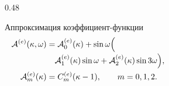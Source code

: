 \begin{frame}[t]
\begin{columns}[T,onlytextwidth]
\begin{column}{0.48\textwidth}
            \vspace{-0.02cm}
            \raggedright
            Аппроксимация коэффициент-функции
            \vspace{-0.18cm}
            \[
            \makebox[\linewidth][l]{$\displaystyle
            \begin{aligned}
            \mathcal A^{(e)}(\kappa,\omega)
            &=
            \mathcal A_0^{(e)}(\kappa)
            +
            \sin\omega
            \Bigl(\\[-0.2em]
            &\quad
            \mathcal A_1^{(e)}(\kappa)\sin\omega
            +
            \mathcal A_2^{(e)}(\kappa)\sin3\omega
            \Bigr),\\
            \mathcal A_m^{(e)}(\kappa)&=C_m^{(e)}(\kappa-1),
            \qquad m=0,1,2.
            \end{aligned}
            $}
            \]
        \end{column}
    \end{columns}
\end{frame}

